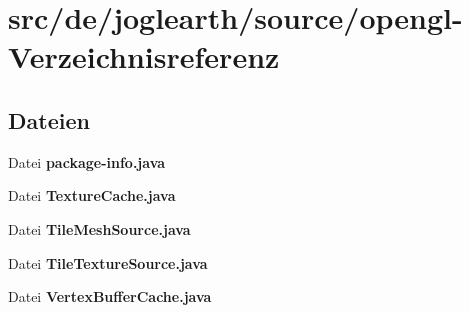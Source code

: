 \section{src/de/joglearth/source/opengl-\/\-Verzeichnisreferenz}
\label{dir_1c4bd8de0497d5cd3b42b99651098027}
\subsection*{Dateien}
\begin{DoxyCompactItemize}
\item 
Datei {\bfseries package-\/info.\-java}
\item 
Datei {\bfseries Texture\-Cache.\-java}
\item 
Datei {\bfseries Tile\-Mesh\-Source.\-java}
\item 
Datei {\bfseries Tile\-Texture\-Source.\-java}
\item 
Datei {\bfseries Vertex\-Buffer\-Cache.\-java}
\end{DoxyCompactItemize}

